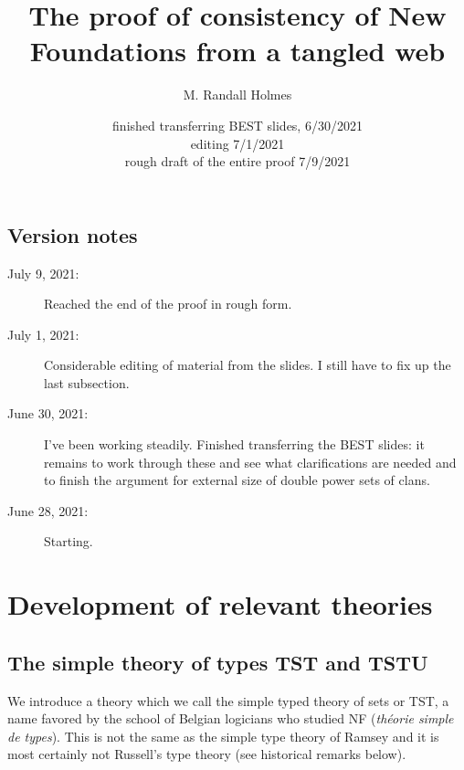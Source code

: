\documentclass[12pt]{article}
\title{The proof of consistency of New Foundations from a tangled web}
\author{M. Randall Holmes}
\date{finished transferring BEST slides, 6/30/2021 \\ editing 7/1/2021 \\ rough draft of the entire proof 7/9/2021}
\begin{document}
\maketitle

\maketitle

\newpage

\subsection{Version notes}

\begin{description}

\item[July 9, 2021:]  Reached the end of the proof in rough form.

\item[July 1, 2021:]  Considerable editing of material from the slides.  I still have to fix up the last subsection.

\item[June 30, 2021:]  I've been working steadily.  Finished transferring the BEST slides:  it remains to work through these and see what clarifications are needed and to finish the
argument for external size of double power sets of clans.

\item[June 28, 2021:]  Starting.



\end{description}


\newpage

\tableofcontents

\newpage

\section{Development of relevant theories}

\subsection{The simple theory of types TST and TSTU}

We introduce a theory which we call the simple typed theory of sets or TST, a name favored by the school of Belgian logicians who studied NF ({\em th\'eorie simple de types}).  This is not the same as the simple type theory of Ramsey and it is most certainly not Russell's type theory  (see historical remarks below).
\end{document}
